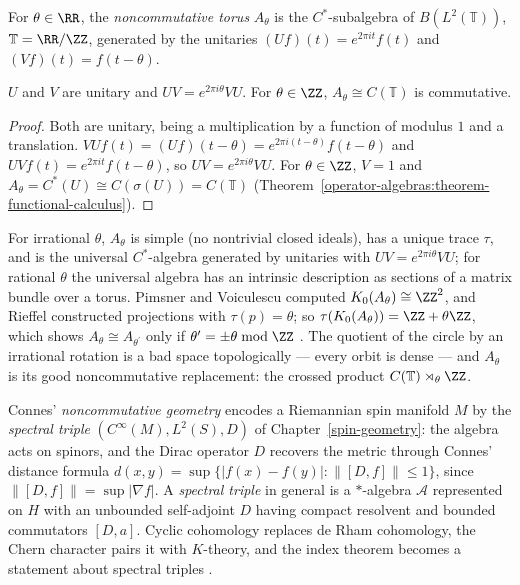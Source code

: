 \begin{definition}\label{operator-algebras:definition-noncommutative-torus}
For $\theta \in \RR$, the \emph{noncommutative torus} $A_\theta$ is the $C^*$-subalgebra of $B(L^2(\mathbb{T}))$, $\mathbb{T} = \RR/\ZZ$, generated by the unitaries $(Uf)(t) = e^{2\pi it}f(t)$ and $(Vf)(t) = f(t - \theta)$.
\end{definition}

\begin{proposition}\label{operator-algebras:proposition-rotation-relation}
$U$ and $V$ are unitary and $UV = e^{2\pi i\theta}VU$. For $\theta \in \ZZ$, $A_\theta \cong C(\mathbb{T})$ is commutative.
\end{proposition}

\begin{proof}
Both are unitary, being a multiplication by a function of modulus $1$ and a translation. $VUf(t) = (Uf)(t - \theta) = e^{2\pi i(t - \theta)}f(t - \theta)$ and $UVf(t) = e^{2\pi it}f(t - \theta)$, so $UV = e^{2\pi i\theta}VU$. For
$\theta \in \ZZ$, $V = 1$ and $A_\theta = C^*(U) \cong C(\sigma(U)) = C(\mathbb{T})$ (Theorem~\ref{operator-algebras:theorem-functional-calculus}).
\end{proof}

\begin{remark}\label{operator-algebras:remark-noncommutative-torus}
For irrational $\theta$, $A_\theta$ is simple (no nontrivial closed ideals), has a unique trace $\tau$, and is the universal $C^*$-algebra generated by unitaries with $UV = e^{2\pi i\theta}VU$; for rational $\theta$ the
universal algebra has an intrinsic description as sections of a matrix bundle over a torus. Pimsner and Voiculescu computed $K_0(A_\theta) \cong \ZZ^2$, and Rieffel constructed projections with $\tau(p) = \theta$; so
$\tau(K_0(A_\theta)) = \ZZ + \theta\ZZ$, which shows $A_\theta \cong A_{\theta^{\prime}}$ only if $\theta^{\prime} = \pm\theta \bmod \ZZ$ \cite{davidson-cstar}. The quotient of the circle by an irrational rotation is a bad space
topologically --- every orbit is dense --- and $A_\theta$ is its good noncommutative replacement: the crossed product $C(\mathbb{T}) \rtimes_\theta \ZZ$.
\end{remark}

\begin{remark}\label{operator-algebras:remark-spectral-triples}
Connes' \emph{noncommutative geometry} encodes a Riemannian spin manifold $M$ by the \emph{spectral triple} $(C^\infty(M), L^2(S), D)$ of Chapter~\ref{spin-geometry}: the algebra acts on spinors, and the Dirac operator $D$ recovers
the metric through Connes' distance formula $d(x, y) = \sup\{|f(x) - f(y)| : \|[D, f]\| \leq 1\}$, since $\|[D, f]\| = \sup|\nabla f|$. A \emph{spectral triple} in general is a $*$-algebra $\mathcal{A}$ represented on $H$ with an
unbounded self-adjoint $D$ having compact resolvent and bounded commutators $[D, a]$. Cyclic cohomology replaces de Rham cohomology, the Chern character pairs it with $K$-theory, and the index theorem becomes a
statement about spectral triples \cite{connes-ncg}.
\end{remark}

